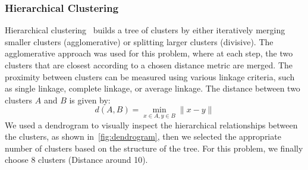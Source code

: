 \documentclass{article} %
\begin{document}
\subsubsection{Hierarchical Clustering}
Hierarchical clustering~\citep{lance1967hierarchical,murtagh2012hierarchical} builds a tree of clusters by either iteratively merging smaller clusters (agglomerative) or splitting larger clusters (divisive). The agglomerative approach was used for this problem, where at each step, the two clusters that are closest according to a chosen distance metric are merged. The proximity between clusters can be measured using various linkage criteria, such as single linkage, complete linkage, or average linkage. The distance between two clusters \( A \) and \( B \) is given by:
$$
d(A, B) = \min_{x \in A, y \in B} \| x - y \|
$$
We used a dendrogram to visually inspect the hierarchical relationships between the clusters, as shown in~\autoref{fig:dendrogram}, then we selected the appropriate number of clusters based on the structure of the tree. For this problem, we finally choose 8 clusters (Distance around 10).
\end{document}
